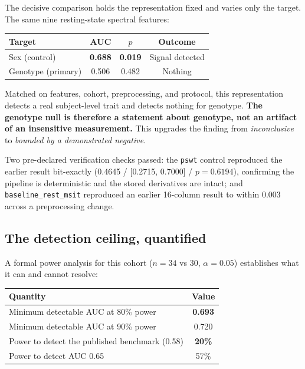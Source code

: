 \documentclass[11pt]{article}
\begin{document}
The decisive comparison holds the representation fixed and varies only the
target. The same nine resting-state spectral features:

\begin{table}[h]
\centering
\begin{tabular}{lccc}
\toprule
Target & AUC & $p$ & Outcome \\
\midrule
Sex (control) & \textbf{0.688} & \textbf{0.019} & Signal detected \\
Genotype (primary) & 0.506 & 0.482 & Nothing \\
\bottomrule
\end{tabular}
\end{table}

Matched on features, cohort, preprocessing, and protocol, this representation
detects a real subject-level trait and detects nothing for genotype.
\textbf{The genotype null is therefore a statement about genotype, not an
artifact of an insensitive measurement.} This upgrades the finding from
\emph{inconclusive} to \emph{bounded by a demonstrated negative}.

Two pre-declared verification checks passed: the \texttt{pswt} control
reproduced the earlier result bit-exactly (0.4645 / [0.2715, 0.7000] /
$p=0.6194$), confirming the pipeline is deterministic and the stored derivatives
are intact; and \texttt{baseline\_rest\_msit} reproduced an earlier
16-column result to within 0.003 across a preprocessing change.

\subsection{The detection ceiling, quantified}

A formal power analysis for this cohort ($n=34$ vs 30, $\alpha=0.05$) establishes
what it can and cannot resolve:

\begin{table}[h]
\centering
\begin{tabular}{lc}
\toprule
Quantity & Value \\
\midrule
Minimum detectable AUC at 80\% power & \textbf{0.693} \\
Minimum detectable AUC at 90\% power & 0.720 \\
Power to detect the published benchmark (0.58) & \textbf{20\%} \\
Power to detect AUC 0.65 & 57\% \\
\bottomrule
\end{tabular}
\end{table}
\end{document}
